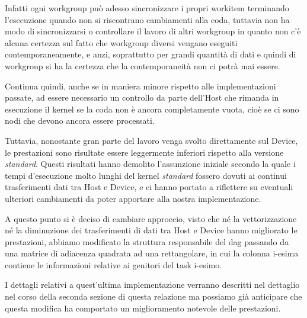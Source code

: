 \documentclass[../relazione.tex]{subfiles}
\begin{document}
Infatti ogni workgroup può adesso sincronizzare i propri workitem terminando l'esecuzione quando non si riscontrano cambiamenti alla coda, tuttavia non ha modo di sincronizzarsi o controllare il lavoro di altri workgroup in quanto non c'è alcuna certezza sul fatto che workgroup diversi vengano eseguiti contemporaneamente, e anzi, soprattutto per grandi quantità di dati e quindi di  workgroup si ha la certezza che la contemporaneità non ci potrà mai essere.

Continua quindi, anche se in maniera minore rispetto alle implementazioni passate, ad essere necessario un controllo da parte dell'Host che rimanda in esecuzione il kernel se la coda non è ancora completamente vuota, cioè se ci sono nodi che devono ancora essere processati.

Tuttavia, nonostante gran parte del lavoro venga svolto direttamente sul Device, le prestazioni sono risultate essere leggermente inferiori rispetto alla versione \textit{standard}. Questi risultati hanno demolito l'assunzione iniziale secondo la quale i tempi d'esecuzione molto lunghi del kernel \textit{standard} fossero dovuti ai continui trasferimenti dati tra Host e Device, e ci hanno portato a riflettere su eventuali ulteriori cambiamenti da poter apportare alla nostra implementazione.


A questo punto si è deciso di cambiare approccio, visto che né la vettorizzazione né la diminuzione dei trasferimenti di dati tra Host e Device hanno migliorato le prestazioni, abbiamo modificato la struttura responsabile del \gls{dag} passando da una matrice di adiacenza quadrata ad una rettangolare, in cui la colonna i-esima contiene le informazioni relative ai genitori del task i-esimo.

I dettagli relativi a quest'ultima implementazione verranno descritti nel dettaglio nel corso della seconda sezione di questa relazione ma possiamo già anticipare che questa modifica ha comportato un miglioramento notevole delle prestazioni.
\end{document}
